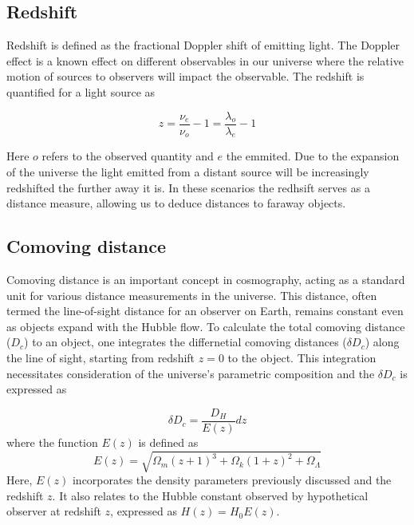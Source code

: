 \documentclass{article}
\begin{document}
\subsection{Redshift}
Redshift is defined as the fractional Doppler shift of emitting light. The Doppler effect is a known effect on different observables in our universe where the relative motion of sources to observers will impact the observable. The redshift is quantified for a light source as 

\begin{equation}
    z = \frac{\nu_e}{\nu_o}-1 = \frac{\lambda_o}{\lambda_e}-1
\end{equation}

Here $o$ refers to the observed quantity and $e$ the emmited. Due to the expansion of the universe the light emitted from a distant source will be increasingly redshifted the further away it is.
In these scenarios the redhsift serves as a distance measure, allowing  us to deduce distances to faraway objects.



\subsection{Comoving distance}


Comoving distance is an important concept in cosmography, 
acting as a standard unit for various distance measurements in the universe. 
This distance, often termed the line-of-sight distance for an observer on Earth, 
remains constant even as objects expand with the Hubble flow. 
To calculate the total comoving distance ($D_c$) to an object, 
one integrates the differnetial comoving distances ($\delta D_c$) along the line of sight, starting from redshift 
$z=0$ to the object. This integration necessitates consideration of the universe's parametric composition and the $\delta D_c$ is expressed as

\begin{equation}
    \delta D_c = \frac{D_H}{E(z)}dz
\end{equation}
where the function $E(z)$ is defined as
\begin{equation}
    E(z)  = \sqrt{\Omega_m(z+1)^3 +\Omega_k (1+z)^2 + \Omega_\Lambda  }
\end{equation}
Here, 
$E(z)$ incorporates the density parameters previously discussed and the redshift 
$z$. It also relates to the Hubble constant observed by hypothetical observer at redshift $z$, expressed as 
$H(z) = H_0 E(z)$.
\end{document}
